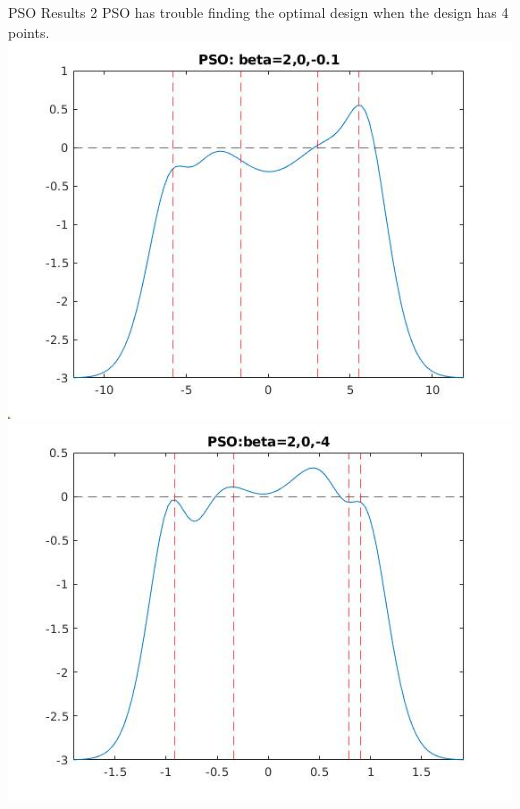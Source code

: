 \documentclass[11pt]{beamer}
\begin{document}
\begin{frame}{PSO Results 2}
PSO has trouble finding the optimal design when the design has 4 points.
\includegraphics[scale=0.28]{quadplots/PSO_1.jpg}
\includegraphics[scale=0.28]{quadplots/PSO_2.jpg}
\end{frame}
\end{document}
